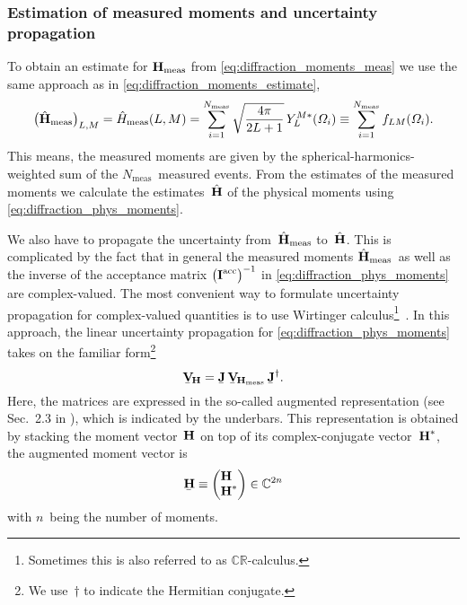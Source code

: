 \subsubsection{Estimation of measured moments and uncertainty propagation}%
\label{sec:diffraction:estimation_uncert}

To obtain an estimate for $\bm{\mathrm{H}}_\text{meas}$ from
\cref{eq:diffraction_moments_meas} we use the same approach as in
\cref{eq:diffraction_moments_estimate}, \ie
\begin{equation}
  \label{eq:diffraction_moments_meas_estimate}
  \rBrk[1]{\hat{\vect{H}}_\text{meas}}_{L, M}
  = \hat{H}_\text{meas}(L, M)
  = \sum_{i = 1}^{N_\text{meas}} \sqrt{\frac{4 \pi}{2 L + 1}}\, Y_L^{M *}(\Omega_i)
  \equiv \sum_{i = 1}^{N_\text{meas}} f_{L M}(\Omega_i).
\end{equation}
This means, the measured moments are given by the
spherical-harmonics-weighted sum of the $N_\text{meas}$~measured
events.  From the estimates of the measured moments we calculate the
estimates~$\hat{\bm{\mathrm{H}}}$ of the physical moments using
\cref{eq:diffraction_phys_moments}.

We also have to propagate the uncertainty
from~$\hat{\bm{\mathrm{H}}}_\text{meas}$ to~$\hat{\bm{\mathrm{H}}}$.  This is
complicated by the fact that in general the measured moments
$\hat{\bm{\mathrm{H}}}_\text{meas}$~as well as the inverse of the
acceptance matrix $\rBrk[1]{\mat{I}^\text{acc}}^{-1}$ in
\cref{eq:diffraction_phys_moments} are complex-valued.  The most
convenient way to formulate uncertainty propagation for complex-valued
quantities is to use Wirtinger calculus\footnote{Sometimes this is
also referred to as
$\mathbb{C}\mathbb{R}$-calculus.}~\cite{wikipedia:WirtingerCalculus,Wirtinger:1927,Kreutz-Delgado:2009,Grube:2023}.
In this approach, the linear uncertainty propagation for
\cref{eq:diffraction_phys_moments} takes on the familiar
form\footnote{We use~$\dagger$ to indicate the Hermitian conjugate.}
\begin{equation}
  \label{eq:complex_uncert_prop}
  \underaccent{\bar}{\covMatSym}_{\!\vect{H}}
  = \underaccent{\bar}{\mat{J}}\, \underaccent{\bar}{\covMatSym}_{\!\vect{H}_\text{meas}}\, \underaccent{\bar}{\mat{J}}^\dagger.
\end{equation}
Here, the matrices are expressed in the so-called augmented
representation (see \eg Sec.~2.3 in ), which is
indicated by the underbars.  This representation is obtained by
stacking the moment vector~$\bm{\mathrm{H}}$ on top of its
complex-conjugate vector~$\bm{\mathrm{H}}^*$, \ie the augmented moment
vector is
\begin{equation}
  \underaccent{\bar}{\vect{H}}
  \equiv \begin{pmatrix*}[l]
    \vect{H} \\
    \vect{H}^*
  \end{pmatrix*}
  \in \mathbb{C}^{2n}
\end{equation}
with $n$~being the number of moments.


